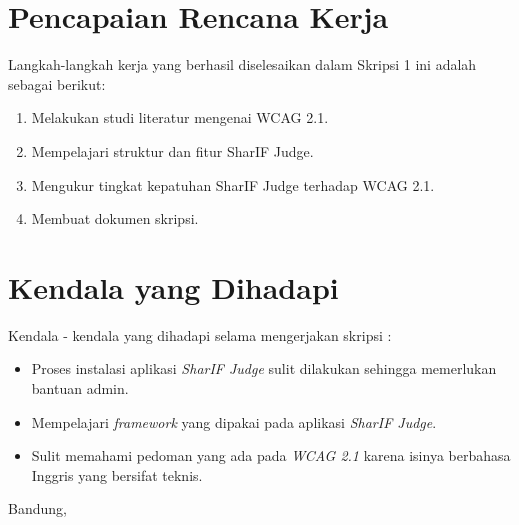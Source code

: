 \documentclass[a4paper,twoside]{article}
\begin{document}
\section{Pencapaian Rencana Kerja}
Langkah-langkah kerja yang berhasil diselesaikan dalam Skripsi 1 ini adalah sebagai berikut:
\begin{enumerate}
\item Melakukan studi literatur mengenai WCAG 2.1.
\item Mempelajari struktur dan fitur SharIF Judge.
\item Mengukur tingkat kepatuhan SharIF Judge terhadap WCAG 2.1.
\item Membuat dokumen skripsi.
\end{enumerate}



\section{Kendala yang Dihadapi}
Kendala - kendala yang dihadapi selama mengerjakan skripsi :
\begin{itemize}
	\item Proses instalasi aplikasi \textit{SharIF Judge} sulit dilakukan sehingga memerlukan bantuan admin.
	\item Mempelajari \textit{framework} yang dipakai pada aplikasi \textit{SharIF Judge}.
	\item Sulit memahami pedoman yang ada pada \textit{WCAG 2.1} karena isinya berbahasa Inggris yang bersifat teknis.
\end{itemize}

\vspace{1cm}
\centering Bandung, \tanggal\\
\vspace{2cm} \nama \\ 
\vspace{1cm}
\end{document}

